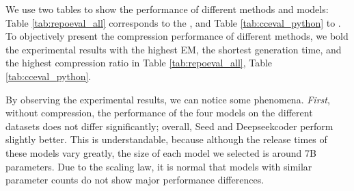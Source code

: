 We use two tables to show the performance of different methods and models: Table \ref{tab:repoeval_all} corresponds to the \repoeval, and Table \ref{tab:cceval_python} to \ccevalpython.
To objectively present the compression performance of different methods, we bold the experimental results with the highest EM, the shortest generation time, and the highest compression ratio in Table \ref{tab:repoeval_all}, Table \ref{tab:cceval_python}.


By observing the experimental results, we can notice some phenomena. \textit{First}, without compression, the performance of the four models on the different datasets does not differ significantly; overall, Seed and Deepseekcoder perform slightly better. This is understandable, because although the release times of these models vary greatly, the size of each model we selected is around 7B parameters. Due to the scaling law, it is normal that models with similar parameter counts do not show major performance differences.

